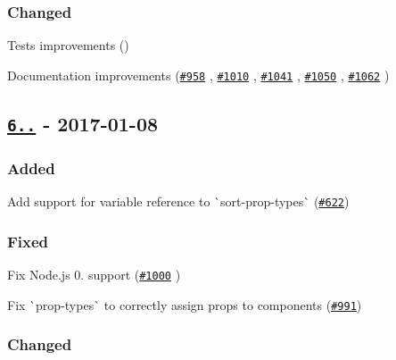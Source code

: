 \subsubsection*{Changed}


\begin{DoxyItemize}
\item Tests improvements ()
\item Documentation improvements (\href{https://github.com/yannickcr/eslint-plugin-react/pull/958}{\tt \#958} , \href{https://github.com/yannickcr/eslint-plugin-react/pull/1010}{\tt \#1010} , \href{https://github.com/yannickcr/eslint-plugin-react/pull/1041}{\tt \#1041} , \href{https://github.com/yannickcr/eslint-plugin-react/pull/1050}{\tt \#1050} , \href{https://github.com/yannickcr/eslint-plugin-react/pull/1062}{\tt \#1062} )
\end{DoxyItemize}

\subsection*{\href{https://github.com/yannickcr/eslint-plugin-react/compare/v6.8.0...v6.9.0}{\tt 6..} -\/ 2017-\/01-\/08}

\subsubsection*{Added}


\begin{DoxyItemize}
\item Add support for variable reference to \`{}sort-\/prop-\/types\`{} (\href{https://github.com/yannickcr/eslint-plugin-react/issues/622}{\tt \#622})
\end{DoxyItemize}

\subsubsection*{Fixed}


\begin{DoxyItemize}
\item Fix Node.\+js 0. support (\href{https://github.com/yannickcr/eslint-plugin-react/pull/1000}{\tt \#1000} )
\item Fix \`{}prop-\/types\`{} to correctly assign props to components (\href{https://github.com/yannickcr/eslint-plugin-react/issues/991}{\tt \#991})
\end{DoxyItemize}

\subsubsection*{Changed}


